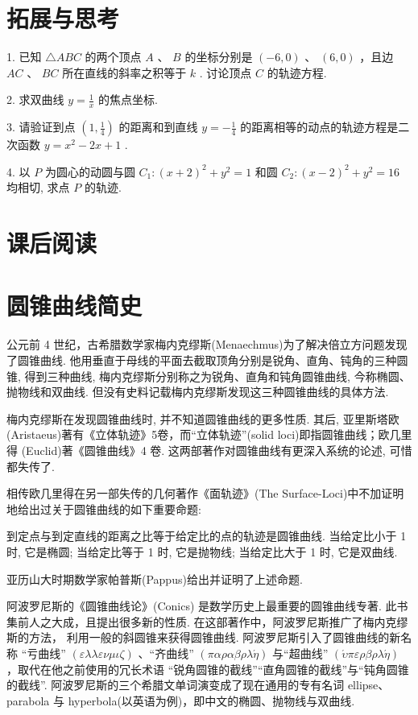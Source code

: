\documentclass[10pt]{article}
\begin{document}
\section*{拓展与思考}

1. 已知 \(\bigtriangleup  {ABC}\) 的两个顶点 \(A\) 、 \(B\) 的坐标分别是 \(\left( {-6,0}\right)\) 、 \(\left( {6,0}\right)\) ，且边 \({AC}\) 、 \({BC}\) 所在直线的斜率之积等于 \(k\) . 讨论顶点 \(C\) 的轨迹方程.

2. 求双曲线 \(y = \frac{1}{x}\) 的焦点坐标.

3. 请验证到点 \(\left( {1,\frac{1}{4}}\right)\) 的距离和到直线 \(y =  - \frac{1}{4}\) 的距离相等的动点的轨迹方程是二次函数 \(y = {x}^{2} - {2x} + 1\) .

4. 以 \(P\) 为圆心的动圆与圆 \({C}_{1} : {\left( x + 2\right) }^{2} + {y}^{2} = 1\) 和圆 \({C}_{2} : {\left( x - 2\right) }^{2} + {y}^{2} = {16}\) 均相切, 求点 \(P\) 的轨迹.

\section*{课后阅读}

\section*{圆锥曲线简史}

公元前 4 世纪，古希腊数学家梅内克缪斯(Menaechmus)为了解决倍立方问题发现了圆锥曲线. 他用垂直于母线的平面去截取顶角分别是锐角、直角、钝角的三种圆锥, 得到三种曲线, 梅内克缪斯分别称之为锐角、直角和钝角圆锥曲线, 今称椭圆、抛物线和双曲线. 但没有史料记载梅内克缪斯发现这三种圆锥曲线的具体方法.

梅内克缪斯在发现圆锥曲线时, 并不知道圆锥曲线的更多性质. 其后, 亚里斯塔欧 (Aristaeus)著有《立体轨迹》5卷，而“立体轨迹”(solid loci)即指圆锥曲线；欧几里得 (Euclid)著《圆锥曲线》4 卷. 这两部著作对圆锥曲线有更深入系统的论述, 可惜都失传了.

相传欧几里得在另一部失传的几何著作《面轨迹》(The Surface-Loci)中不加证明地给出过关于圆锥曲线的如下重要命题:

到定点与到定直线的距离之比等于给定比的点的轨迹是圆锥曲线. 当给定比小于 1 时, 它是椭圆; 当给定比等于 1 时, 它是抛物线; 当给定比大于 1 时, 它是双曲线.

亚历山大时期数学家帕普斯(Pappus)给出并证明了上述命题.

阿波罗尼斯的《圆锥曲线论》(Conics) 是数学历史上最重要的圆锥曲线专著. 此书集前人之大成，且提出很多新的性质. 在这部著作中，阿波罗尼斯推广了梅内克缪斯的方法， 利用一般的斜圆锥来获得圆锥曲线. 阿波罗尼斯引入了圆锥曲线的新名称 “亏曲线” \(\left( {{\varepsilon \lambda }\lambda {\varepsilon \nu }\mu {\iota \zeta }}\right)\) 、“齐曲线” \(\left( {{\pi \alpha }{\rho \alpha \beta \rho \lambda }\acute{\eta }}\right)\) 与“超曲线” \(\left( {{\acute{\upsilon }{\pi \varepsilon \rho \beta \rho \lambda }}\acute{\eta }}\right)\) ，取代在他之前使用的冗长术语 “锐角圆锥的截线”“直角圆锥的截线”与“钝角圆锥的截线”. 阿波罗尼斯的三个希腊文单词演变成了现在通用的专有名词 ellipse、parabola 与 hyperbola(以英语为例)，即中文的椭圆、抛物线与双曲线.
\end{document}
